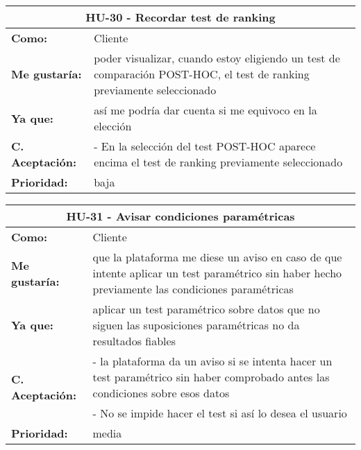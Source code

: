 
\begin{table}[H]
	\begin{tabular}{| p{3cm}| p{11cm} |}
		\hline
		\multicolumn{2}{|c|}{\textbf{HU-30} - Recordar test de ranking} \\ \hline
		\textbf{Como:} & Cliente \\ \hline
		\textbf{Me gustaría:} & poder visualizar, cuando estoy eligiendo un test de comparación POST-HOC, el test de ranking previamente seleccionado \\ \hline
		\textbf{Ya que:} & así me podría dar cuenta si me equivoco en la elección \\ \hline
		\textbf{C. Aceptación:} & - En la selección del test POST-HOC aparece encima el test de ranking previamente seleccionado \\ \hline
		\textbf{\textbf{Prioridad:}} & baja \\ \hline
	\end{tabular}
\end{table}


\begin{table}[H]
	\begin{tabular}{| p{3cm}| p{11cm} |}
		\hline
		\multicolumn{2}{|c|}{\textbf{HU-31} - Avisar condiciones paramétricas} \\ \hline
		\textbf{Como:} & Cliente \\ \hline
		\textbf{Me gustaría:} & que la plataforma me diese un aviso en caso de que intente aplicar un test paramétrico sin haber hecho previamente las condiciones paramétricas \\ \hline
		\textbf{Ya que:} & aplicar un test paramétrico sobre datos que no siguen las suposiciones paramétricas no da resultados fiables \\ \hline
		\multirow{2}{11cm}{\textbf{C. Aceptación:}} & - la plataforma da un aviso si se intenta hacer un test paramétrico sin haber comprobado antes las condiciones sobre esos datos \\
		& - No se impide hacer el test si así lo desea el usuario \\ \hline
		\textbf{\textbf{Prioridad:}} & media \\ \hline
	\end{tabular}
\end{table}



